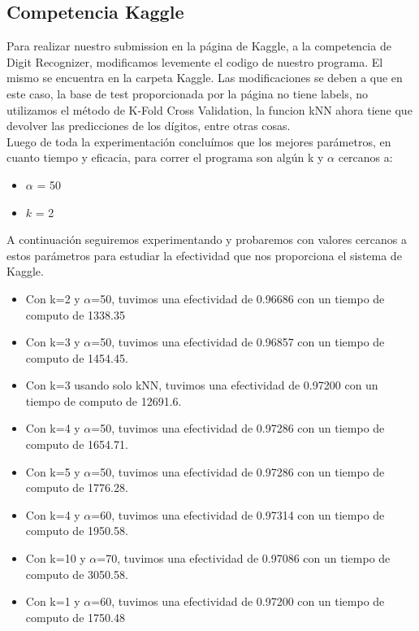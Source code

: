 \subsection{Competencia Kaggle}
Para realizar nuestro submission en la página de Kaggle, a la competencia de Digit Recognizer, modificamos levemente el codigo de nuestro programa. El mismo se encuentra en la carpeta Kaggle. Las modificaciones se deben a que en este caso, la base de test proporcionada por la página no tiene labels, no utilizamos el método de K-Fold Cross Validation, la funcion kNN ahora tiene que devolver las predicciones de los dígitos, entre otras cosas.\\
Luego de toda la experimentación concluímos que los mejores parámetros, en cuanto tiempo y eficacia, para correr el programa son algún k y $\alpha$ cercanos a:
\begin{itemize}
\item $\alpha$ = 50
\item $k$ = 2
\end{itemize}

A continuación seguiremos experimentando y probaremos con valores cercanos a estos parámetros para estudiar la efectividad que nos proporciona el sistema de Kaggle.
\begin{itemize}
	\item Con k=2 y $\alpha$=50, tuvimos una efectividad de 0.96686 con un tiempo de computo de 1338.35 
	\item Con k=3 y $\alpha$=50, tuvimos una efectividad de 0.96857 con un tiempo de computo de 1454.45.
	\item Con k=3 usando solo kNN, tuvimos una efectividad de 0.97200 con un tiempo de computo de 12691.6.
	\item Con k=4 y $\alpha$=50, tuvimos una efectividad de 0.97286 con un tiempo de computo de 1654.71.
	\item Con k=5 y $\alpha$=50, tuvimos una efectividad de 0.97286 con un tiempo de computo de 1776.28.
	\item Con k=4 y $\alpha$=60, tuvimos una efectividad de 0.97314 con un tiempo de computo de 1950.58.
	\item Con k=10 y $\alpha$=70, tuvimos una efectividad de 0.97086 con un tiempo de computo de 3050.58.
	\item Con k=1 y $\alpha$=60, tuvimos una efectividad de 0.97200 con un tiempo de computo de 1750.48

\end{itemize}